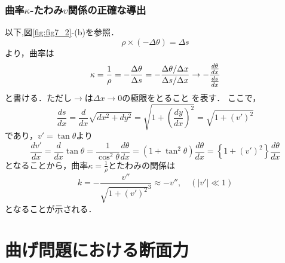 \documentclass[10pt,a4j]{jarticle}
\begin{document}
\subsubsection*{曲率$\kappa$-たわみ$v$関係の正確な導出}
以下,図\ref{fig:fig7_2}-(b)を参照．
\begin{equation}
	\rho  \times \left( { - \Delta \theta } \right) = \Delta s
\end{equation}
より，曲率は
\[
	\kappa  = \frac{1}{\rho } =  - \frac{{\Delta \theta }}{{\Delta s}} =  - \frac{{{{\Delta \theta } \mathord{\left/
 {\vphantom {{\Delta \theta } {\Delta x}}} \right.
 \kern-\nulldelimiterspace} {\Delta x}}}}{{{{\Delta s} \mathord{\left/
 {\vphantom {{\Delta s} {\Delta x}}} \right.
 \kern-\nulldelimiterspace} {\Delta x}}}} \to  - \frac{{\frac{{d\theta }}{{dx}}}}{{\frac{{ds}}{{dx}}}}
\]
と書ける．ただし$\rightarrow$は$\Delta x \rightarrow 0$の極限をとること
を表す．
ここで，
\begin{equation}
	\frac{{ds}}{{dx}} = \frac{d}{{dx}}\sqrt {d{x^2} + d{y^2}}  = \sqrt {1 + {{\left( {\frac{{dy}}{{dx}}} \right)}^2}}  = \sqrt {1 + {{\left( {v'} \right)}^2}} 
\end{equation}
であり，$v'=\tan \theta$より
\begin{equation}
	\frac{{dv'}}{{dx}} = \frac{d}{{dx}}\tan \theta  = \frac{1}{{{{\cos }^2}\theta }}\frac{{d\theta }}{{dx}} = \left( {1 + {{\tan }^2}\theta } \right)\frac{{d\theta }}{{dx}} = \left\{ {1 + {{\left( {v'} \right)}^2}} \right\}\frac{{d\theta }}{{dx}}
\end{equation}
となることから，曲率$\kappa=\frac{1}{\rho}$とたわみの関係は
\begin{equation}
	k =  - \frac{{v''}}{{{{\sqrt {1 + {{\left( {v'} \right)}^2}} }^3}}} \approx  - v'',\quad \left( {\left| {v'} \right| \ll 1} \right)
\end{equation}
となることが示される．
\section{曲げ問題における断面力}
\end{document}
